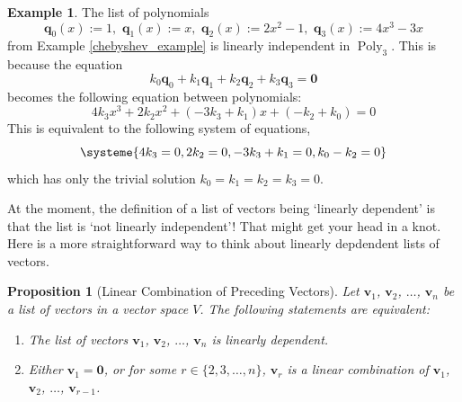 \documentclass[a4paper,11pt]{book}
\newtheorem{proposition}[theorem]{Proposition}
\theoremstyle{definition}
\newtheorem{example_environment}{Example}[chapter]
\newcommand{\ve}[1]{\mathbf{#1}}
\newenvironment{example}
	{
		\begin{oframed} 
		\begin{example_environment}
	}
	{
		\end{example_environment}
		\end{oframed}
	}
\DeclareMathOperator{\Poly}{Poly}
\begin{document}
\begin{example} The list of polynomials  \label{new_basis_for_poly_3}
\[
\ve{q}_0(x) := 1, \,\, \ve{q}_1(x) := x, \,\, \ve{q}_2(x) := 2x^2 - 1, \,\, \ve{q}_3(x) := 4x^3 - 3x
\]
from Example \ref{chebyshev_example} is linearly independent in $\Poly_3$. This is because the equation
\[
k_0 \ve{q}_0 + k_1 \ve{q}_1 + k_2 \ve{q}_2 + k_3 \ve{q}_3 = \ve{0}
\]	
becomes the following equation between polynomials:
\[
 4k_3 x^3 + 2k_2 x^2 + (-3k_3 + k_1) x + (-k_2 + k_0) = 0
\]
This is equivalent to the following system of equations,
\[
 \systeme{ 4k_3 = 0, 2k_2 = 0, -3 k_3 + k_1 = 0 , k_0 - k_2 = 0}
\]
which has only the trivial solution $k_0 = k_1 = k_2 = k_3 = 0$.
\end{example}


At the moment, the definition of a list of vectors being `linearly dependent' is that the list is `not linearly independent'! That might get your head in a knot. Here is a more straightforward way to think about linearly depdendent lists of vectors.
\begin{proposition}[Linear Combination of Preceding Vectors] \label{lin_dependence_prop} Let $\ve{v}_1$, $\ve{v}_2$, $\ldots$, $\ve{v}_n$ be a list of vectors in a vector space $V$. The following statements are equivalent:
\begin{enumerate} \item The list of vectors $\ve{v}_1$, $\ve{v}_2$, $\ldots$, $\ve{v}_n$ is linearly dependent.
\item Either $\ve{v}_1 = \ve{0}$, or for some $r \in \{2, 3, \ldots, n\}$, $\ve{v}_r$ is a linear combination of $\ve{v}_1$, $\ve{v}_2$, $\ldots$, $\ve{v}_{r-1}$.
\end{enumerate}
\end{proposition}
\end{document}
